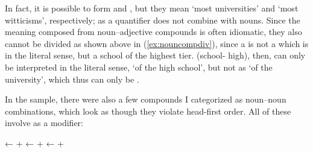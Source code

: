 In fact, it is possible to form  and 
, but they mean `most universities' and `most 
witticisms', respectively;  as a quantifier does not 
combine with nouns. Since the meaning composed from noun--adjective compounds 
is often idiomatic, they also cannot be divided as shown above in 
(\ref{ex:nouncompdiv}), since a  is not 
a  which is  in the literal 
sense, but a school of the highest tier.  
(school-\Gen{} high), then, can only be interpreted in the literal sense, `of 
the high school', but not as `of the university', which thus can only be 
.

In the sample, there were also a few compounds I categorized as noun--noun 
combinations, which look as though they violate head-first order. All of these 
involve  as a modifier:

\pex\label{ex:compsitang}
	\a {}
		← 
		+ 
	\a {}
		← 
		+ 
	\a {}
		← 
		+ 
\xe

